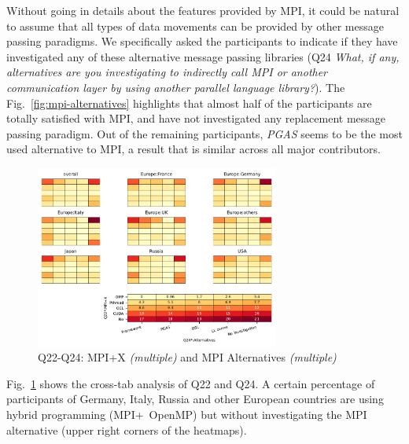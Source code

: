 \documentclass[preprint,5p,times]{elsarticle}
\def\myquote#1{{\it #1}}
\def\mcountries{major contributors\xspace{}}%
\begin{document}
Without going in details about the features provided by MPI, it could be natural
to assume that all types of data movements can be provided by other message
passing paradigms. We specifically asked the participants to indicate if they
have investigated any of these alternative message passing libraries (Q24
\myquote{What, if any, alternatives are you investigating to indirectly call MPI
or another communication layer by using another parallel language library?}).
The Fig.~\ref{fig:mpi-alternatives} highlights that almost half of the
participants are totally satisfied with MPI, and have not investigated any
replacement message passing paradigm. Out of the remaining participants,
\myquote{PGAS} seems to be the most used alternative to MPI, a result that is
similar across all \mcountries.


\begin{figure}[htb]
\begin{center}
\includegraphics[width=8.0cm]{Figs/Q22-Q24.pdf}
\caption{Q22-Q24: MPI+X {\it(multiple)} and MPI Alternatives {\it(multiple)}}
\label{fig:mpi-x-and-alternatives}
\end{center}
\end{figure}

Fig.~\ref{fig:mpi-x-and-alternatives} shows the cross-tab analysis of Q22 and
Q24. A certain percentage of participants of Germany, Italy, Russia and other
European countries are using hybrid programming (MPI+\ OpenMP) but without
investigating the MPI alternative (upper right corners of the heatmaps).
\end{document}
